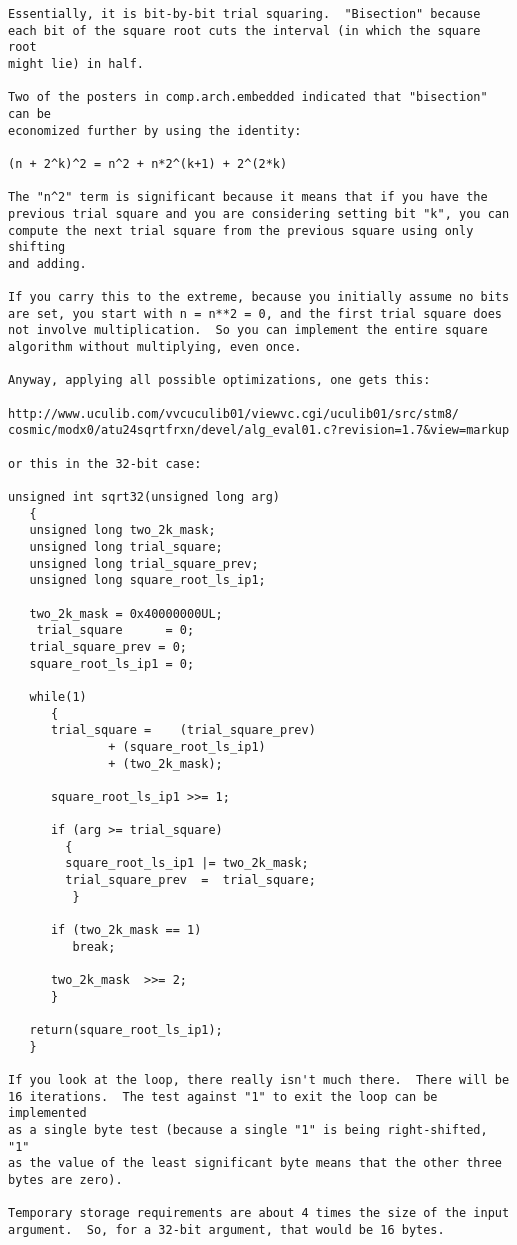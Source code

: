 \begin{tiny}
\begin{verbatim}
Essentially, it is bit-by-bit trial squaring.  "Bisection" because 
each bit of the square root cuts the interval (in which the square root
might lie) in half.
 
Two of the posters in comp.arch.embedded indicated that "bisection" can be
economized further by using the identity:
 
(n + 2^k)^2 = n^2 + n*2^(k+1) + 2^(2*k)
 
The "n^2" term is significant because it means that if you have the
previous trial square and you are considering setting bit "k", you can
compute the next trial square from the previous square using only shifting
and adding.
 
If you carry this to the extreme, because you initially assume no bits
are set, you start with n = n**2 = 0, and the first trial square does
not involve multiplication.  So you can implement the entire square
algorithm without multiplying, even once.
 
Anyway, applying all possible optimizations, one gets this:
 
http://www.uculib.com/vvcuculib01/viewvc.cgi/uculib01/src/stm8/
cosmic/modx0/atu24sqrtfrxn/devel/alg_eval01.c?revision=1.7&view=markup
 
or this in the 32-bit case:
 
unsigned int sqrt32(unsigned long arg)
   {
   unsigned long two_2k_mask;
   unsigned long trial_square;
   unsigned long trial_square_prev;
   unsigned long square_root_ls_ip1;

   two_2k_mask = 0x40000000UL;
    trial_square      = 0;
   trial_square_prev = 0;
   square_root_ls_ip1 = 0;

   while(1)
      {
      trial_square =    (trial_square_prev) 
              + (square_root_ls_ip1)
              + (two_2k_mask);

      square_root_ls_ip1 >>= 1; 

      if (arg >= trial_square)
        {
        square_root_ls_ip1 |= two_2k_mask;
        trial_square_prev  =  trial_square; 
         }

      if (two_2k_mask == 1)
         break;

      two_2k_mask  >>= 2;
      }
   
   return(square_root_ls_ip1);
   }

If you look at the loop, there really isn't much there.  There will be
16 iterations.  The test against "1" to exit the loop can be implemented
as a single byte test (because a single "1" is being right-shifted, "1"
as the value of the least significant byte means that the other three
bytes are zero).
 
Temporary storage requirements are about 4 times the size of the input
argument.  So, for a 32-bit argument, that would be 16 bytes.
\end{verbatim}
\end{tiny}


